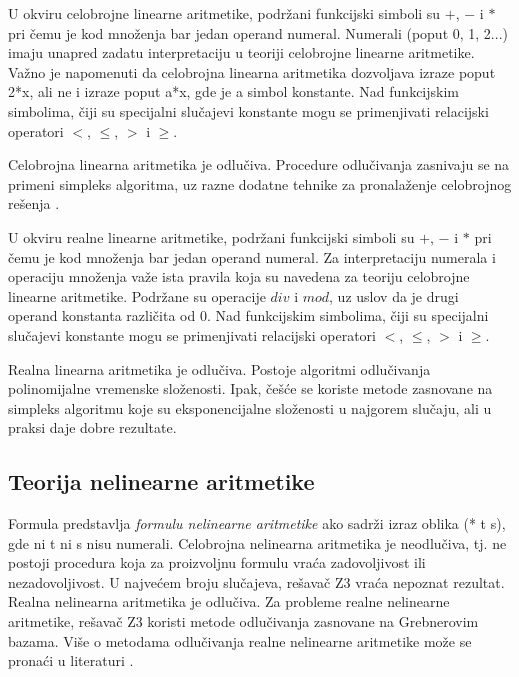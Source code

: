 \documentclass[12pt,oneside]{memoir}
\begin{document}
U okviru celobrojne linearne aritmetike, podržani funkcijski simboli su $+$, $-$ i $*$ pri čemu je kod množenja bar jedan operand numeral. Numerali (poput 0, 1, 2...) imaju unapred zadatu interpretaciju u teoriji celobrojne linearne aritmetike. Važno je napomenuti da celobrojna linearna aritmetika dozvoljava izraze poput 2*x, ali ne i izraze poput a*x, gde je a simbol konstante. Nad funkcijskim simbolima, čiji su specijalni slučajevi konstante mogu se primenjivati relacijski operatori $<$, $\leq$, $>$ i $\geq$. 
\par
Celobrojna linearna aritmetika je odlučiva. Procedure odlučivanja zasnivaju se na primeni simpleks algoritma, uz razne dodatne tehnike za pronalaženje celobrojnog rešenja \cite{Simplex}.
\par
U okviru realne linearne aritmetike, podržani funkcijski simboli su $+$, $-$ i $*$ pri čemu je kod množenja bar jedan operand numeral. Za interpretaciju numerala i operaciju množenja važe ista pravila koja su navedena za teoriju celobrojne linearne aritmetike. Podržane su operacije $div$ i $mod$, uz uslov da je drugi operand konstanta različita od 0. Nad funkcijskim simbolima, čiji su specijalni slučajevi konstante mogu se primenjivati relacijski operatori $<$, $\leq$, $>$ i $\geq$. 
\par
Realna linearna aritmetika je odlučiva. Postoje algoritmi odlučivanja polinomijalne vremenske složenosti. Ipak, češće se koriste metode zasnovane na simpleks algoritmu koje su eksponencijalne složenosti u najgorem slučaju, ali u praksi daje dobre rezultate. 
\subsection{Teorija nelinearne aritmetike} 

Formula predstavlja \emph{formulu nelinearne aritmetike} ako sadrži izraz oblika (* t s), gde ni t ni s nisu numerali.
Celobrojna nelinearna aritmetika je neodlučiva, tj. ne postoji procedura koja za proizvoljnu formulu vraća zadovoljivost ili nezadovoljivost. U najvećem broju slučajeva, rešavač Z3 vraća nepoznat rezultat. Realna nelinearna aritmetika je odlučiva. Za probleme realne nelinearne aritmetike, rešavač Z3 koristi metode odlučivanja zasnovane na Grebnerovim bazama. Više o metodama odlučivanja realne nelinearne aritmetike može se pronaći u literaturi \cite{SolvingNLA}.
\end{document}
